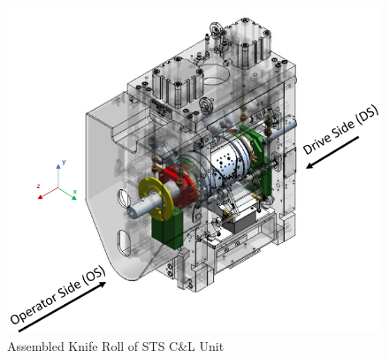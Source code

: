 \begin{figure}[H]
    \centering
    \includegraphics[width=1\linewidth]{FIGURES/knife.png}
    \caption{Assembled Knife Roll of STS C\&L Unit~\cite{knife}}
    \label{knife}
\end{figure}

